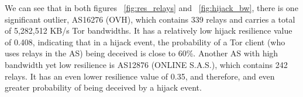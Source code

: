 We can see that in both figures ~\ref{fig:res_relays} and ~\ref{fig:hijack_bw}, there is one significant outlier, AS16276 (OVH), which contains 339 relays and carries a total of 5,282,512 KB/s Tor bandwidths. It has a relatively low hijack resilience value of 0.408, indicating that in a hijack event, the probability of a Tor client (who uses relays in the AS) being deceived is close to 60\%. Another AS with high bandwidth yet low resilience is AS12876 (ONLINE S.A.S.), which contains 242 relays. It has an even lower resilience value of 0.35, and therefore, and even greater probability of being deceived by a hijack event. \\




%

